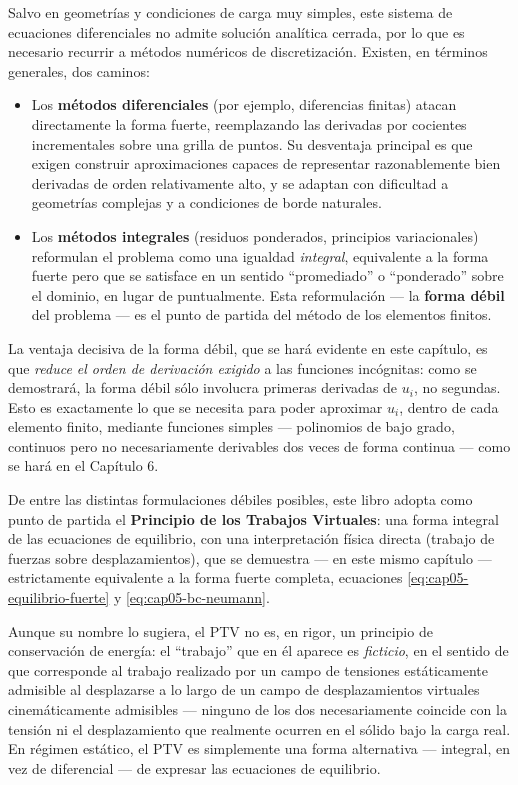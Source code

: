 Salvo en geometrías y condiciones de carga muy simples, este sistema de ecuaciones diferenciales no admite solución analítica cerrada, por lo que es necesario recurrir a métodos numéricos de discretización. Existen, en términos generales, dos caminos:
\begin{itemize}[leftmargin=1.6em]
  \item Los \textbf{métodos diferenciales} (por ejemplo, diferencias finitas) atacan directamente la forma fuerte, reemplazando las derivadas por cocientes incrementales sobre una grilla de puntos. Su desventaja principal es que exigen construir aproximaciones capaces de representar razonablemente bien derivadas de orden relativamente alto, y se adaptan con dificultad a geometrías complejas y a condiciones de borde naturales.
  \item Los \textbf{métodos integrales} (residuos ponderados, principios variacionales) reformulan el problema como una igualdad \emph{integral}, equivalente a la forma fuerte pero que se satisface en un sentido ``promediado'' o ``ponderado'' sobre el dominio, en lugar de puntualmente. Esta reformulación --- la \textbf{forma débil} del problema --- es el punto de partida del método de los elementos finitos.
\end{itemize}
La ventaja decisiva de la forma débil, que se hará evidente en este capítulo, es que \emph{reduce el orden de derivación exigido} a las funciones incógnitas: como se demostrará, la forma débil sólo involucra primeras derivadas de $u_i$, no segundas. Esto es exactamente lo que se necesita para poder aproximar $u_i$, dentro de cada elemento finito, mediante funciones simples --- polinomios de bajo grado, continuos pero no necesariamente derivables dos veces de forma continua --- como se hará en el Capítulo 6.

De entre las distintas formulaciones débiles posibles, este libro adopta como punto de partida el \textbf{Principio de los Trabajos Virtuales}: una forma integral de las ecuaciones de equilibrio, con una interpretación física directa (trabajo de fuerzas sobre desplazamientos), que se demuestra --- en este mismo capítulo --- estrictamente equivalente a la forma fuerte completa, ecuaciones \eqref{eq:cap05-equilibrio-fuerte} y \eqref{eq:cap05-bc-neumann}.

\begin{observacion}
Aunque su nombre lo sugiera, el PTV no es, en rigor, un principio de conservación de energía: el ``trabajo'' que en él aparece es \emph{ficticio}, en el sentido de que corresponde al trabajo realizado por un campo de tensiones estáticamente admisible al desplazarse a lo largo de un campo de desplazamientos virtuales cinemáticamente admisibles --- ninguno de los dos necesariamente coincide con la tensión ni el desplazamiento que realmente ocurren en el sólido bajo la carga real. En régimen estático, el PTV es simplemente una forma alternativa --- integral, en vez de diferencial --- de expresar las ecuaciones de equilibrio.
\end{observacion}

